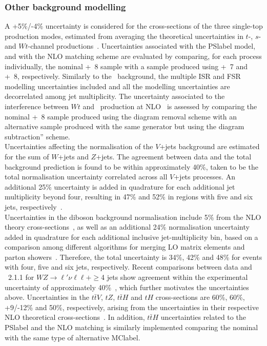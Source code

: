 \subsubsection{Other background modelling}

A +5\%/-4\% uncertainty is considered for the cross-sections of the three single-top production modes, estimated from averaging the theoretical uncertainties in $t$-, $s$- and $Wt$-channel productions~\cite{Kidonakis_2010,Kidonakis_2011}. Uncertainties associated with the \acrshort{PSlabel} model, and with the NLO matching scheme are evaluated by comparing, for each process individually, the nominal \POWHEGBOX+\PYTHIA~8 sample with a sample produced using \POWHEGBOX+\HERWIG~7 and \MGMCatNLO+\PYTHIA~8, respectively. Similarly to the \ttbar\ background, the multiple ISR and FSR modelling uncertainties included and all the modelling uncertainties are decorrelated among jet multiplicity. The uncertainty associated to the interference between $Wt$ and \ttbar\ production at NLO~\cite{Frixione_2008} is assessed by comparing the nominal \POWHEGBOX+\PYTHIA~8 sample produced using the diagram removal scheme with an alternative sample produced with the same generator but using the diagram subtraction” scheme.\\

Uncertainties affecting the normalisation of the $V$+jets background are estimated for the sum of $W$+jets and $Z$+jets. The agreement between data and the total background prediction is found to be within approximately 40\%, taken to be the total normalisation uncertainty correlated across all $V$+jets processes. An additional 25\% uncertainty is added in quadrature for each additional jet multiplicity beyond four, resulting in 47\% and 52\% in regions with five and six jets, respectively~\cite{0706.2569}.\\

Uncertainties in the diboson background normalisation include 5\% from the NLO theory cross-sections~\cite{hep-ph/9905386}, as well as an additional 24\% normalisation uncertainty added in quadrature for each additional inclusive jet-multiplicity bin, based on a comparison among different algorithms for merging LO matrix elements and parton showers~\cite{0706.2569}. Therefore, the total uncertainty is 34\%, 42\% and 48\% for events with four, five and six jets, respectively. Recent comparisons between data and \SHERPA~2.1.1 for $WZ\to\ell'\nu\ell\ell+\geq$4 jets show agreement within the experimental uncertainty of approximately 40\%~\cite{WZbosommeasure}, which further motivates the uncertainties above. Uncertainties in the $t\bar{t}V$, $tZ$, $t\bar{t}H$ and $tH$ cross-sections are 60\%, 60\%, +9/-12\% and 50\%, respectively, arising from the uncertainties in their respective NLO theoretical cross-sections~\cite{CYRM-2017-002,ttVmeasurement}. In addition, $t\bar{t}H$ uncertainties related to the \acrshort{PSlabel} and the NLO matching is similarly implemented comparing the nominal with the same type of alternative \acrshort{MClabel}.